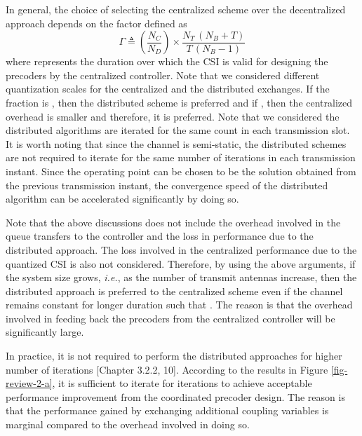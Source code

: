 \begin{enumerate}
\begin{itemize}
In general, the choice of selecting the centralized scheme over the decentralized approach depends on the factor \eqn{\Gamma} defined as
\begin{equation}
\Gamma \triangleq \left (\frac{N_C}{N_D} \right ) \times \frac{N_T \, (N_B + T)}{T \, (N_B - 1)}
\end{equation}
where  represents the duration over which the \ac{CSI} is valid for designing the precoders by the centralized controller. Note that we considered different quantization scales for the centralized and the distributed exchanges. If the fraction is , then the distributed scheme is preferred and if , then the centralized overhead is smaller and therefore, it is preferred. Note that we considered the distributed algorithms are iterated for the same count in each transmission slot. It is worth noting that since the channel is semi-static, the distributed schemes are not required to iterate for the same number of iterations in each transmission instant. Since the operating point can be chosen to be the solution obtained from the previous transmission instant, the convergence speed of the distributed algorithm can be accelerated significantly by doing so. 

Note that the above discussions does not include the overhead involved in the queue transfers to the controller and the loss in performance due to the distributed approach. The loss involved in the centralized performance due to the quantized \ac{CSI} is also not considered. Therefore, by using the above arguments, if the system size grows, \textit{i.e.}, as the number of transmit antennas increase, then the distributed approach is preferred to the centralized scheme even if the channel remains constant for longer duration such that . The reason is that the overhead involved in feeding back the precoders from the centralized controller will be significantly large.

In practice, it is not required to perform the distributed approaches for higher number of iterations [Chapter 3.2.2, 10]. According to the results in Figure \ref{fig-review-2-a}, it is sufficient to iterate for  iterations to achieve acceptable performance improvement from the coordinated precoder design. The reason is that the performance gained by exchanging additional coupling variables is marginal compared to the overhead involved in doing so.


\end{itemize}
\end{enumerate}
